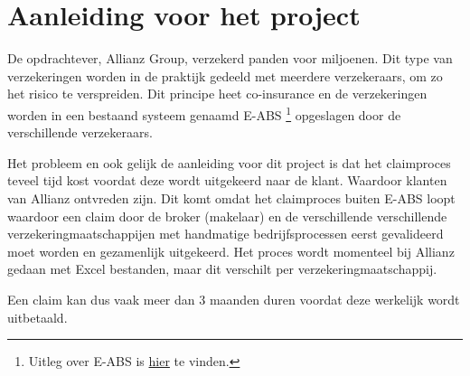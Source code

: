 \chapter{Aanleiding voor het project}
De opdrachtever, Allianz Group, verzekerd panden voor miljoenen. Dit type van verzekeringen worden in de praktijk gedeeld met meerdere verzekeraars, om zo het risico te verspreiden. Dit principe heet co-insurance en de verzekeringen worden in een bestaand systeem genaamd E-ABS \footnote{Uitleg over E-ABS is \href{https://www.vnab.nl/nl-NL/eABS/Over-eABS}{hier} te vinden.} opgeslagen door de verschillende verzekeraars.

\par Het probleem en ook gelijk de aanleiding voor dit project is dat het claimproces teveel tijd kost voordat deze wordt uitgekeerd naar de klant. Waardoor klanten van Allianz ontvreden zijn. Dit komt omdat het claimproces buiten E-ABS loopt waardoor een claim door de broker (makelaar) en de verschillende verschillende verzekeringmaatschappijen met handmatige bedrijfsprocessen eerst gevalideerd moet worden en gezamenlijk uitgekeerd. Het proces wordt momenteel bij Allianz gedaan met Excel bestanden, maar dit verschilt per verzekeringmaatschappij.\par
 Een claim kan dus vaak meer dan 3 maanden duren voordat deze werkelijk wordt uitbetaald.